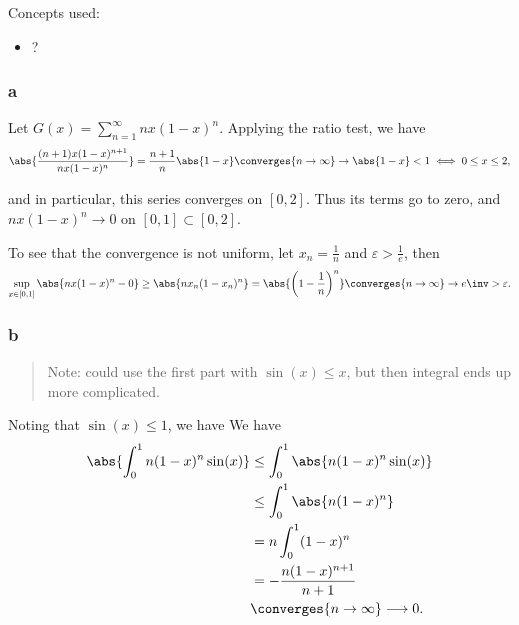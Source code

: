 \begin{solution}

Concepts used:

\begin{itemize}
\tightlist
\item
  ?
\end{itemize}

\hypertarget{a-2}{%
\subsubsection{a}\label{a-2}}

Let \(G(x) = \sum_{n=1}^\infty nx(1-x)^n\). Applying the ratio test, we
have
\begin{align*}
\abs{\frac{(n+1)x(1-x)^{n+1}}{nx(1-x)^n}} = \frac{n+1}{n} \abs{1-x} \converges{n\to\infty}\to \abs{1-x} < 1 \iff 0 \leq x \leq 2
,\end{align*}

and in particular, this series converges on \([0, 2]\). Thus its terms
go to zero, and \(nx(1-x)^n \to 0\) on \([0, 1] \subset [0, 2]\).

To see that the convergence is not uniform, let \(x_n = \frac 1 n\) and
\(\varepsilon > \frac 1 e\), then
\begin{align*}
\sup_{x\in [0, 1]}\abs{nx(1-x)^n - 0} 
\geq \abs{nx_n (1-x_n)^n} 
= \abs{\left( 1 - \frac 1 n\right)^n} 
\converges{n\to\infty}\to e\inv
> \varepsilon
.\end{align*}

\hypertarget{b-2}{%
\subsubsection{b}\label{b-2}}

\begin{quote}
Note: could use the first part with \(\sin(x) \leq x\), but then
integral ends up more complicated.
\end{quote}

Noting that \(\sin(x) \leq 1\), we have We have
\begin{align*}
\abs{\int_0^1  n(1-x)^{n} \sin(x)} 
&\leq \int_0^1  \abs{n(1-x)^n \sin(x)} \\
&\leq \int_0^1  \abs{n (1-x)^n}  \\
&= n\int_0^1 (1-x)^n \\
&= -\frac{n(1-x)^{n+1}}{n+1} \\
&\converges{n\to\infty}\longrightarrow 0
.\end{align*}

\end{solution}

